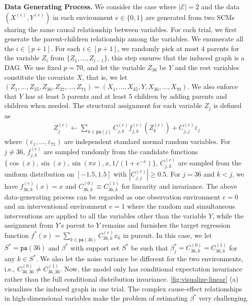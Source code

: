 \documentclass[10pt]{article}
\numberwithin{equation}{section}
\begin{document}
\noindent \textbf{Data Generating Process.} We consider the case where $|\mathcal{E}|=2$ and the data $(X^{(e)}, Y^{(e)})$ in each environment $e\in \{0,1\}$ are generated from two SCMs sharing the same causal relationship between variables. For each trial, we first generate the parent-children relationship among the variables. We enumerate all the $i\in [p+1]$. For each $i\in [p+1]$, we randomly pick at most $4$ parents for the variable $Z_i$ from $\{Z_1,\ldots, Z_{i-1}\}$, this step ensures that the induced graph is a DAG. We use fixed $p=70$, and let the variable $Z_{36}$ be $Y$ and the rest variables constitute the covariate $X$, that is, we let $(Z_1,\ldots, Z_{35}, Z_{36}, Z_{37}, \ldots, Z_{71})=(X_1,\ldots, X_{35}, Y, X_{36}, \ldots, X_{70})$. We also enforce that $Y$ has at least $5$ parents and at least $5$ children by adding parents and children when needed.  The structural assignment for each variable $Z_j$ is defined as
\begin{align*}
    Z_j^{(e)} \gets \sum_{k\in \mathtt{pa}(j)} C_{j,k}^{(e)} f_{j,k}^{(e)}(Z_k^{(e)}) + C_{j, j}^{(e)} \varepsilon_j
\end{align*} where $(\varepsilon_1,\ldots, \varepsilon_{71})$ are independent standard normal random variables. For $j\neq 36$, $f_{j,k}^{(e)}$ are sampled randomly from the candidate functions $\{\cos(x), \sin(x), \sin(\pi x), x, 1/(1+e^{-x})\}$, $C_{j,k}^{(e)}$ are sampled from the uniform distribution on $[-1.5, 1.5]$ with $|C_{j,j}^{(e)}| \ge 0.5$. For $j=36$ and $k<j$, we have $f_{36,k}^{(e)}(x)=x$ and $C_{36,k}^{(0)}\equiv C_{36,k}^{(1)}$ for linearity and invariance. The above data-generating process can be regarded as one observation environment $e=0$ and an interventional environment $e=1$ where the random and simultaneous interventions are applied to all the variables other than the variable $Y$, while the assignment from $Y$'s parent to $Y$ remains and furnishes the target regression function $f^*(x) = \sum_{k\in \mathtt{pa}(36)} C_{36, k}^{(e)} x_k$ in pursuit. In this case, we let $S^* = \mathtt{pa}(36)$ and $\beta^*$ with support set $S^*$ be such that $\beta_j^*=C^{(0)}_{36, k}=C^{(1)}_{36, k}$ for any $k\in S^*$. We also let the noise variance be different for the two environments, i.e., $C_{36,36}^{(0)} \neq C_{36,36}^{(1)}$. Now, the model only has conditional expectation invariance rather than the full conditional distribution invariance. \cref{fig:visualize-linear} (a) visualizes the induced graph in one trial. The complex cause-effect relationships in high-dimensional variables make the problem of estimating $\beta^*$ very challenging.
\end{document}
